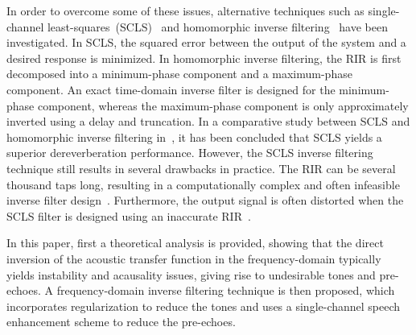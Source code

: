 \documentclass{article}
\begin{document}
In order to overcome some of these issues, alternative techniques such as single-channel least-squares~(SCLS)~\cite{Mourjopoulos_1982} and homomorphic inverse filtering~\cite{Mourjopoulos_1982,Radlovic_2000} have been investigated. 
In SCLS, the squared error between the output of the system and a desired response is minimized. 
In homomorphic inverse filtering, the RIR is first decomposed into a minimum-phase component and a maximum-phase component. An exact time-domain inverse filter is designed for the minimum-phase component, whereas the maximum-phase component is only approximately inverted using a delay and truncation. 
In a comparative study between SCLS and homomorphic inverse filtering in~\cite{Mourjopoulos_1982}, it has been concluded that SCLS yields a superior dereverberation performance. 
However, the SCLS inverse filtering technique still results in several drawbacks in practice. 
The RIR can be several thousand taps long, resulting in a computationally complex and often infeasible inverse filter design~\cite{Naylor_IWAENC_2005}. 
Furthermore, the output signal is often distorted when the SCLS filter is designed using an inaccurate RIR~\cite{Naylor_IWAENC_2005}.

In this paper, first a theoretical analysis is provided, showing that the direct inversion of the acoustic transfer function in the frequency-domain typically yields instability and acausality issues, giving rise to undesirable tones and pre-echoes.
A frequency-domain inverse filtering technique is then proposed, which incorporates regularization to reduce the tones and uses a single-channel speech enhancement scheme to reduce the pre-echoes. 
\end{document}
